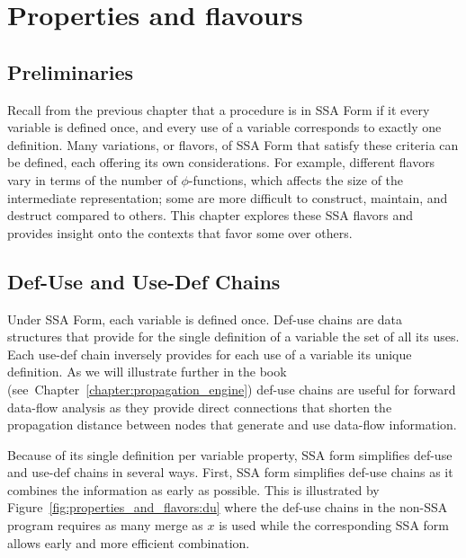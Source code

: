 \chapter{Properties and flavours }
\label{chap:properties_and_flavours}
\graphicspath{{Figs/}{properties_and_flavours/Figs/}{part3/properties_and_flavours/Figs/}}


\section{Preliminaries}

Recall from the previous chapter that a procedure is in SSA Form if it
every variable is defined once, and every use of a variable corresponds
to exactly one definition. Many variations, or flavors, of SSA Form that 
satisfy these criteria can be defined, each offering its own considerations.
For example, different flavors vary in terms of the number of $\phi$-functions,
which affects the size of the intermediate representation; some are more difficult to construct, maintain, and destruct
compared to others. This chapter explores these SSA flavors and provides
insight onto the contexts that favor some over others. 

\section{Def-Use and Use-Def Chains}
Under SSA Form, each variable is defined once. Def-use chains are data structures that provide for the single definition of a variable the set of all its uses. Each use-def chain inversely provides for each use of a variable its unique definition. As we will illustrate further in the book (see~Chapter~\ref{chapter:propagation_engine}) def-use chains are useful for forward data-flow analysis as they provide direct connections that shorten the propagation distance between nodes that generate and use data-flow information. 

Because of its single definition per variable property, SSA form simplifies def-use and use-def chains in several ways. First, SSA form simplifies def-use chains as it combines the information as early as possible.
This is illustrated by Figure~\ref{fig:properties_and_flavors:du} where the def-use chains in the non-SSA program requires as many merge as $x$ is used while the corresponding SSA form allows early and more efficient combination. 

